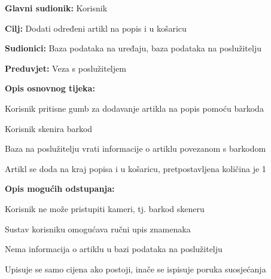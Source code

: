 				\noindent {}
					\begin{packed_item}
						\item \textbf{Glavni sudionik:} Korisnik
						\item  \textbf{Cilj:} Dodati određeni artikl na popis i u košaricu
						\item  \textbf{Sudionici:} Baza podataka na uređaju, baza podataka na poslužitelju
						\item  \textbf{Preduvjet:} Veza s poslužiteljem
						\item  \textbf{Opis osnovnog tijeka:}
						\item[] \begin{packed_enum}
							\item Korisnik pritisne gumb za dodavanje artikla na popis pomoću barkoda
							\item Korisnik skenira barkod
							\item Baza na poslužitelju vrati informacije o artiklu povezanom s barkodom
							\item Artikl se doda na kraj popisa i u košaricu, pretpostavljena količina je 1
						\end{packed_enum}
						\item  \textbf{Opis mogućih odstupanja:}
						\item[] \begin{packed_item}
							\item[2.a] Korisnik ne može pristupiti kameri, tj. barkod skeneru
							\item[] \begin{packed_enum}
								\item Sustav korisniku omogućava ručni upis znamenaka
							\end{packed_enum}
							\item[3.a] Nema informacija o artiklu u bazi podataka na poslužitelju
							\item[] \begin{packed_enum}
							    \item Upisuje se samo cijena ako postoji, inače se ispisuje poruka suosjećanja
							\end{packed_enum}
						\end{packed_item}
					\end{packed_item}
				
